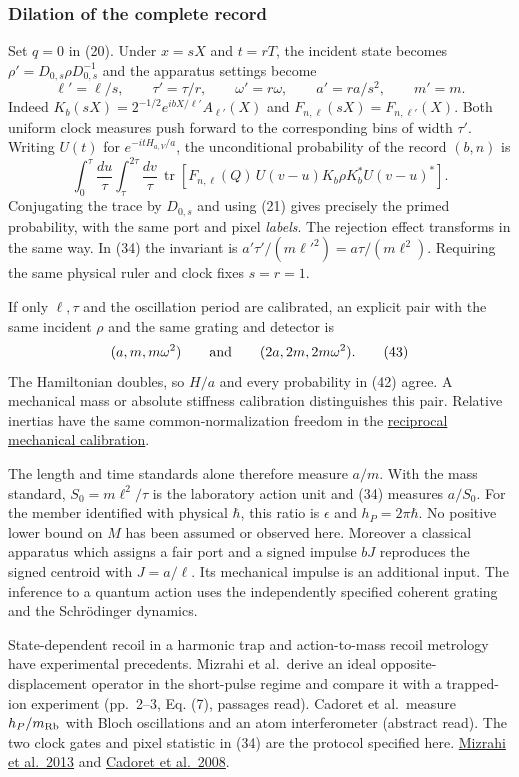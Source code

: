 \documentclass[11pt,a4paper]{article}
\begin{document}
\subsubsection{Dilation of the complete
record}\label{dilation-of-the-complete-record}

Set \(q=0\) in (20). Under \(x=sX\) and \(t=rT\), the incident state
becomes \(\rho'=D_{0,s}\rho D_{0,s}^{-1}\) and the apparatus settings
become \[
 \ell'=\ell/s,\qquad \tau'=\tau/r,\qquad
 \omega'=r\omega,\qquad a'=ra/s^2,\qquad m'=m .
 \tag{41}
\] Indeed \(K_b(sX)=2^{-1/2}e^{ibX/\ell'}A_{\ell'}(X)\) and
\(F_{n,\ell}(sX)=F_{n,\ell'}(X)\). Both uniform clock measures push
forward to the corresponding bins of width \(\tau'\). Writing \(U(t)\)
for \(e^{-itH_{a,V}/a}\), the unconditional probability of the record
\((b,n)\) is \[
 \int_0^\tau\frac{du}{\tau}\int_\tau^{2\tau}\frac{dv}{\tau}\,
 \operatorname{tr}\!\left[
 F_{n,\ell}(Q)\,U(v-u)K_b\rho K_b^*U(v-u)^*\right].
 \tag{42}
\] Conjugating the trace by \(D_{0,s}\) and using (21) gives precisely
the primed probability, with the same port and pixel \emph{labels}. The
rejection effect transforms in the same way. In (34) the invariant is
\(a'\tau'/(m\ell'^2)=a\tau/(m\ell^2)\). Requiring the same physical
ruler and clock fixes \(s=r=1\).

If only \(\ell,\tau\) and the oscillation period are calibrated, an
explicit pair with the same incident \(\rho\) and the same grating and
detector is \[
 (a,m,m\omega^2)\qquad\hbox{and}\qquad(2a,2m,2m\omega^2).
 \tag{43}
\] The Hamiltonian doubles, so \(H/a\) and every probability in (42)
agree. A mechanical mass or absolute stiffness calibration distinguishes
this pair. Relative inertias have the same common-normalization freedom
in the
\href{rotation-composition-universality.md\#reciprocal-mechanical-calibration}{reciprocal
mechanical calibration}.

The length and time standards alone therefore measure \(a/m\). With the
mass standard, \(S_0=m\ell^2/\tau\) is the laboratory action unit and
(34) measures \(a/S_0\). For the member identified with physical
\(\hbar\), this ratio is \(\epsilon\) and \(h_P=2\pi\hbar\). No positive
lower bound on \(M\) has been assumed or observed here. Moreover a
classical apparatus which assigns a fair port and a signed impulse
\(bJ\) reproduces the signed centroid with \(J=a/\ell\). Its mechanical
impulse is an additional input. The inference to a quantum action uses
the independently specified coherent grating and the Schrödinger
dynamics.

State-dependent recoil in a harmonic trap and action-to-mass recoil
metrology have experimental precedents. Mizrahi et al.~derive an ideal
opposite-displacement operator in the short-pulse regime and compare it
with a trapped-ion experiment (pp.~2--3, Eq. (7), passages read).
Cadoret et al.~measure \(h_P/m_{\rm Rb}\) with Bloch oscillations and an
atom interferometer (abstract read). The two clock gates and pixel
statistic in (34) are the protocol specified here.
\href{https://arxiv.org/pdf/1201.6597}{Mizrahi et al.~2013} and
\href{https://arxiv.org/abs/0810.3152}{Cadoret et al.~2008}.
\end{document}
